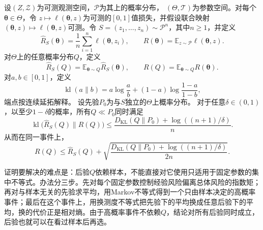 \begin{theorem}
\label{thm:pac-bayes-bound}
设$(Z,\mathcal Z)$为可测观测空间，$\mathcal P$为其上的概率分布，
$(\Theta,\mathcal T)$为参数空间。对每个$\bm\theta\in\Theta$，令
$z\mapsto\ell(\bm\theta,z)$为可测的$[0,1]$值损失，并假设联合映射
$(\bm\theta,z)\mapsto\ell(\bm\theta,z)$可测。令
$S=(z_1,\ldots,z_n)\sim\mathcal P^n$，其中$n\geq1$，并定义
\[
 \hat R_S(\bm\theta)=\frac1n\sum_{i=1}^n\ell(\bm\theta,z_i),
 \qquad
 R(\bm\theta)=\mathbb E_{z\sim\mathcal P}\ell(\bm\theta,z).
\]
对$\Theta$上的任意概率分布$Q$，定义
\[
 \hat R_S(Q)=\mathbb E_{\bm\theta\sim Q}\hat R_S(\bm\theta),
 \qquad
 R(Q)=\mathbb E_{\bm\theta\sim Q}R(\bm\theta).
\]
对$a,b\in[0,1]$，定义
\[
 \operatorname{kl}(a\|b)
 =a\log\frac ab+(1-a)\log\frac{1-a}{1-b},
\]
端点按连续延拓解释。
设先验$P_0$为与$S$独立的$\Theta$上概率分布。
对于任意$\delta\in(0,1)$，以至少$1-\delta$的概率，所有$Q\ll P_0$同时满足
\begin{equation}
 \operatorname{kl}\bigl(\hat R_S(Q)\|R(Q)\bigr)
 \leq\frac{D_{\mathrm{KL}}(Q\|P_0)+\log((n+1)/\delta)}{n}.
 \label{eq:pac-bayes-kl}
\end{equation}
从而在同一事件上，
\[
 R(Q)\leq\hat R_S(Q)+
 \sqrt{\frac{D_{\mathrm{KL}}(Q\|P_0)+\log((n+1)/\delta)}{2n}}.
\]
\end{theorem}
证明要解决的难点是：后验$Q$依赖样本，不能直接对它使用只适用于固定参数的集中不等式。办法分三步。先对每个固定参数控制经验风险偏离总体风险的指数矩；再对与样本无关的先验求平均，用Markov不等式得到一个只由样本决定的高概率事件；最后在这个事件上，用换测度不等式把先验下的平均换成任意后验下的平均，换的代价正是相对熵。由于高概率事件不依赖$Q$，结论对所有后验同时成立，后验也就可以在看过样本后再选。
